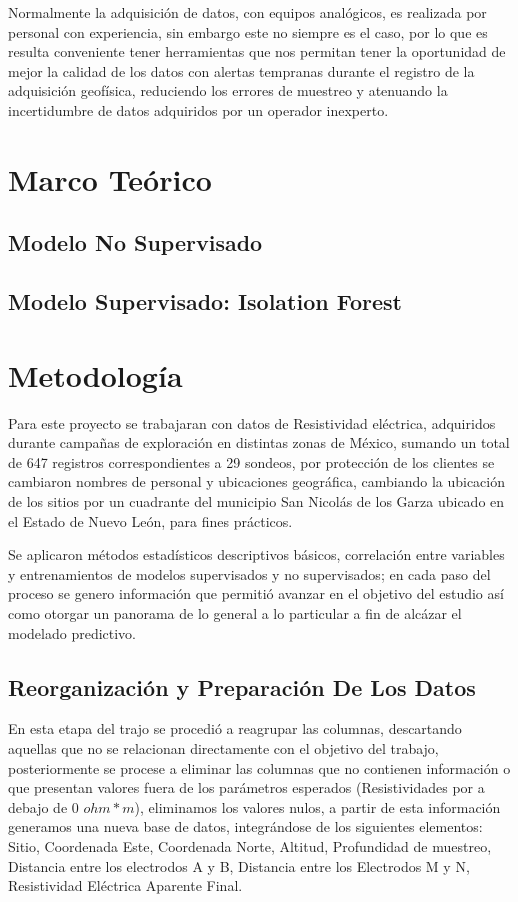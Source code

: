 \documentclass[sn-mathphys,Numbered]{sn-jnl}%
\theoremstyle{thmstyleone}%
\theoremstyle{thmstyletwo}%
\theoremstyle{thmstylethree}%
\begin{document}
Normalmente la adquisición de datos, con equipos analógicos, es realizada por personal con experiencia, sin embargo este no siempre es el caso, por lo que es resulta conveniente tener herramientas que nos permitan tener la oportunidad de mejor la calidad de los datos con alertas tempranas durante el registro de la adquisición geofísica, reduciendo los errores de muestreo y atenuando la incertidumbre de datos adquiridos por un operador inexperto.

\section{Marco Teórico}\label{sec2}

\subsection{Modelo No Supervisado}\label{subsec1}

\subsection{Modelo Supervisado: Isolation Forest}\label{subsec2}


\section{Metodología}\label{sec3}
Para este proyecto se trabajaran con datos de Resistividad eléctrica, adquiridos durante campañas de exploración en distintas zonas de México, sumando un total de 647 registros correspondientes a 29 sondeos, por protección de los clientes se cambiaron nombres de personal y ubicaciones geográfica, cambiando la ubicación de los sitios por un cuadrante del municipio San Nicolás de los Garza ubicado en el Estado de Nuevo León, para fines prácticos.

Se aplicaron métodos estadísticos descriptivos básicos, correlación entre variables y entrenamientos de modelos supervisados y no supervisados; en cada paso del proceso se genero información que permitió avanzar en el objetivo del estudio así como otorgar un panorama de lo general a lo particular a fin de alcázar el modelado predictivo.

\subsection{Reorganización y Preparación De Los Datos}\label{subsec3}

En esta etapa del trajo se procedió a reagrupar las columnas, descartando aquellas que no se relacionan directamente con el objetivo del trabajo, posteriormente se procese a eliminar las columnas que no contienen información o que presentan valores fuera de los parámetros esperados (Resistividades por a debajo de $0$ $ohm*m$), eliminamos los valores nulos, a partir de esta información generamos una nueva base de datos, integrándose de los siguientes elementos: Sitio, Coordenada Este, Coordenada Norte, Altitud, Profundidad de muestreo, Distancia entre los electrodos A y B, Distancia entre los Electrodos M y N, Resistividad Eléctrica Aparente Final.\\
\end{document}
